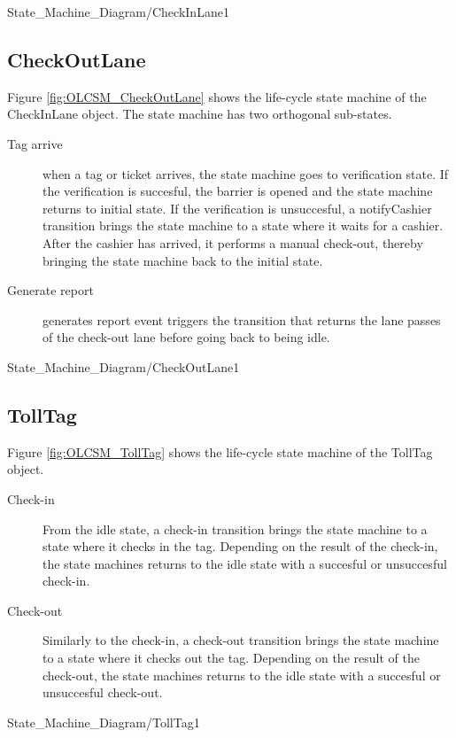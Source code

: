 \begin{myfigure}{State_Machine_Diagram/CheckInLane}{1}
\caption{Object Life Cycle State Machine CheckInLane. \madeby{\jb}{\mt}}
\label{fig:OLCSM_CheckInLane}

\end{myfigure}

\subsection{CheckOutLane}
\madeby{\kj}{\af}
Figure \ref{fig:OLCSM_CheckOutLane} shows the life-cycle state machine of the CheckInLane object. The state machine has two orthogonal sub-states.

\begin{description}
	\item[Tag arrive] when a tag or ticket arrives, the state machine goes to verification state. If the verification is succesful, the barrier is opened and the state machine returns to initial state. If the verification is unsuccesful, a notifyCashier transition brings the state machine to a state where it waits for a cashier. After the cashier has arrived, it performs a manual check-out, thereby bringing the state machine back to the initial state.
	\item[Generate report] generates report event triggers the transition that returns the lane passes of the check-out lane before going back to being idle.
\end{description}


\begin{myfigure}{State_Machine_Diagram/CheckOutLane}{1}
\caption{Object Life Cycle State Machine CheckOutLane. \madeby{\kj}{\af}}
\label{fig:OLCSM_CheckOutLane}

\end{myfigure}

\subsection{TollTag}
\madebyone{\mb}
Figure \ref{fig:OLCSM_TollTag} shows the life-cycle state machine of the TollTag object.

\begin{description}

	\item[Check-in] From the idle state, a check-in transition brings the state machine to a state where it checks in the tag. Depending on the result of the check-in, the state machines returns to the idle state with a succesful or unsuccesful check-in.
	
	\item[Check-out] Similarly to the check-in, a check-out transition brings the state machine to a state where it checks out the tag. Depending on the result of the check-out, the state machines returns to the idle state with a succesful or unsuccesful check-out.
	
\end{description}
	

\begin{myfigure}{State_Machine_Diagram/TollTag}{1}
\caption{Object Life Cycle State Machine TollTag.\madebyone{\mb}}
\label{fig:OLCSM_TollTag}

\end{myfigure}
